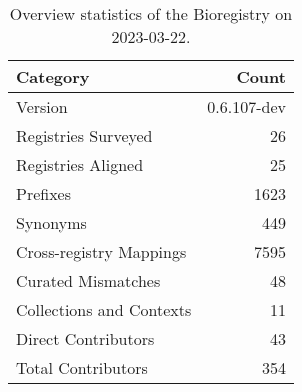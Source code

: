 \begin{table}
\centering
\caption{Overview statistics of the Bioregistry on 2023-03-22.}
\label{tab:bioregistry-summary}
\begin{tabular}{lr}
\toprule
                Category &       Count \\
\midrule
                 Version & 0.6.107-dev \\
     Registries Surveyed &          26 \\
      Registries Aligned &          25 \\
                Prefixes &        1623 \\
                Synonyms &         449 \\
 Cross-registry Mappings &        7595 \\
      Curated Mismatches &          48 \\
Collections and Contexts &          11 \\
     Direct Contributors &          43 \\
      Total Contributors &         354 \\
\bottomrule
\end{tabular}
\end{table}
